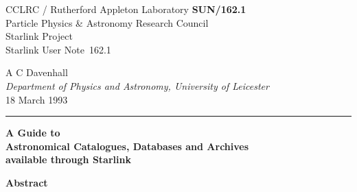 \documentclass[twoside,11pt]{article}
\newcommand{\stardoccategory}  {Starlink User Note}
\newcommand{\stardocinitials}  {SUN}
\newcommand{\stardocnumber}    {162.1}
\newcommand{\stardocauthors}   {A C Davenhall \\
{\it Department of Physics and Astronomy, University of Leicester} }
\newcommand{\stardocdate}      {18 March 1993}
\newcommand{\stardoctitle}     {A Guide to\\[2ex]
                        Astronomical Catalogues, Databases and Archives\\[2ex]
                        available through Starlink}
\newcommand{\stardocname}{\stardocinitials /\stardocnumber}
\newenvironment{latexonly}{}{}
\begin{document}
\thispagestyle{empty}

\begin{latexonly}
   CCLRC / {\sc Rutherford Appleton Laboratory} \hfill {\bf \stardocname}\\
   {\large Particle Physics \& Astronomy Research Council}\\
   {\large Starlink Project\\}
   {\large \stardoccategory\ \stardocnumber}
   \begin{flushright}
   \stardocauthors\\
   \stardocdate
   \end{flushright}
   \vspace{-4mm}
   \rule{\textwidth}{0.5mm}
   \vspace{5mm}
   \begin{center}
   {\Huge\bf  \stardoctitle}
   \end{center}
   \vspace{5mm}

   \vspace{10mm}
   \begin{center}
      {\Large\bf Abstract}
   \end{center}
\end{latexonly}
\end{document}
